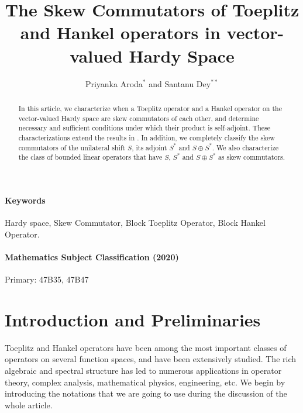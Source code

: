 \documentclass[12pt, reqno]{amsart}
\theoremstyle{definition}
\theoremstyle{remark}
\numberwithin{equation}{section}
\begin{document}
	\title[The Skew Commutators of Toeplitz and Hankel operators]{The Skew Commutators of Toeplitz and Hankel operators in vector-valued Hardy Space}
	
	\author[Priyanka Aroda and Santanu Dey]{Priyanka Aroda$^*$ and Santanu Dey$^{**}$}
	\maketitle
	
	\begin{abstract}
            In this article, we characterize when a Toeplitz operator and a Hankel operator on the vector-valued Hardy space are skew commutators of each other, and determine necessary and sufficient conditions under which their product is self-adjoint. These characterizations extend the results in \cite{LZD}. In addition, we completely classify the skew commutators of the unilateral shift $S$, its adjoint $S^*$ and $S\oplus S^*.$ We also characterize the class of bounded linear operators that have $S$, $S^*$ and $S\oplus S^*$ as skew commutators.
    \end{abstract}
    
	\vspace{0.5cm}
	\paragraph{\textbf{Keywords}} Hardy space, Skew Commutator,  Block Toeplitz Operator, Block Hankel Operator. 
    
	\vspace{0.5cm}
	\paragraph{\textbf{Mathematics Subject Classification (2020)}}Primary: 47B35, 47B47

    \vspace{0.1in}


	\section{{Introduction and Preliminaries}}
    \noindent

    Toeplitz and Hankel operators have been among the most important classes of operators on several function spaces, and have been extensively studied. The rich algebraic and spectral structure has led to numerous applications in operator theory, complex analysis, mathematical physics, engineering, etc. We begin by introducing the notations that we are going to use during the discussion of the whole article.
 
\end{document}
